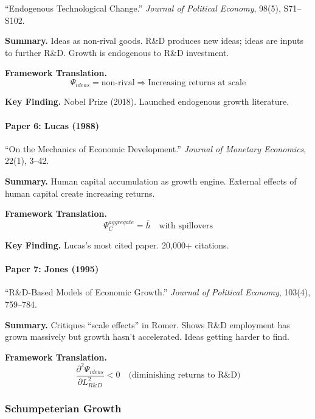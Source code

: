 ``Endogenous Technological Change.''
\textit{Journal of Political Economy}, 98(5), S71--S102.

\textbf{Summary.}
Ideas as non-rival goods. R\&D produces new ideas; ideas are inputs to 
further R\&D. Growth is endogenous to R\&D investment.

\textbf{Framework Translation.}
\begin{equation}
\Psi_{ideas} = \text{non-rival} \Rightarrow \text{Increasing returns at scale}
\end{equation}

\textbf{Key Finding.}
Nobel Prize (2018). Launched endogenous growth literature.

\paragraph{Paper 6: Lucas (1988)}

``On the Mechanics of Economic Development.''
\textit{Journal of Monetary Economics}, 22(1), 3--42.

\textbf{Summary.}
Human capital accumulation as growth engine. External effects of human capital 
create increasing returns.

\textbf{Framework Translation.}
\begin{equation}
\Psi_C^{aggregate} = \bar{h} \quad \text{with spillovers}
\end{equation}

\textbf{Key Finding.}
Lucas's most cited paper. 20,000+ citations.

\paragraph{Paper 7: Jones (1995)}

``R\&D-Based Models of Economic Growth.''
\textit{Journal of Political Economy}, 103(4), 759--784.

\textbf{Summary.}
Critiques ``scale effects'' in Romer. Shows R\&D employment has grown 
massively but growth hasn't accelerated. Ideas getting harder to find.

\textbf{Framework Translation.}
\begin{equation}
\frac{\partial^2 \Psi_{ideas}}{\partial L_{R\&D}^2} < 0 \quad \text{(diminishing returns to R\&D)}
\end{equation}

\subsubsection{Schumpeterian Growth}

